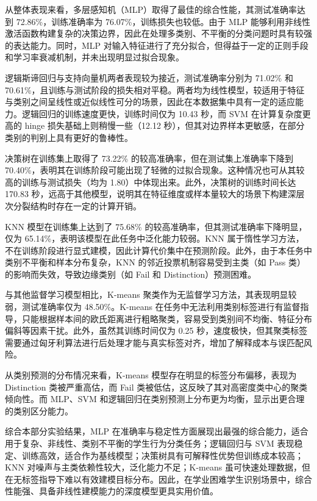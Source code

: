 \documentclass[a4paper, utf8]{ctexart}
\begin{document}
	从整体表现来看，多层感知机（MLP）取得了最佳的综合性能，其测试准确率达到 72.86\%，训练准确率为 76.07\%，训练损失也较低。由于 MLP 能够利用非线性激活函数构建复杂的决策边界，因此在处理多类别、不平衡的分类问题时具有较强的表达能力。同时，MLP 对输入特征进行了充分拟合，但得益于一定的正则手段和学习率衰减机制，并未出现明显过拟合现象。
	
	逻辑斯谛回归与支持向量机两者表现较为接近，测试准确率分别为 71.02\% 和 70.61\%，且训练与测试阶段的损失相对平稳。两者均为线性模型，较适用于特征与类别之间呈线性或近似线性可分的场景，因此在本数据集中具有一定的适应能力。逻辑回归的训练速度更快，训练时间仅为 10.43 秒，而 SVM 在计算复杂度更高的 hinge 损失基础上则稍慢一些（12.12 秒），但其对边界样本更敏感，在部分类别的判别上具有更好的鲁棒性。
	
	决策树在训练集上取得了 73.22\% 的较高准确率，但在测试集上准确率下降到 70.40\%，表明其在训练阶段可能出现了轻微的过拟合现象。这种情况也可从其较高的训练与测试损失（均为 1.80）中体现出来。此外，决策树的训练时间长达 170.83 秒，远高于其他模型，说明其在特征维度或样本量较大的场景下构建深层次分裂结构时存在一定的计算开销。
	
	KNN 模型在训练集上达到了 75.68\% 的较高准确率，但其测试准确率下降明显，仅为 65.14\%，表明该模型在此任务中泛化能力较弱。KNN 属于惰性学习方法，不在训练阶段进行显式建模，因此计算代价集中在预测阶段。此外，由于本任务中类别不平衡和样本分布复杂，KNN 的邻近投票机制容易受到主类（如 Pass 类）的影响而失效，导致边缘类别（如 Fail 和 Distinction）预测困难。
	
	与其他监督学习模型相比，K-means 聚类作为无监督学习方法，其表现明显较弱，测试准确率仅为 48.50\%。K-means 在任务中无法利用类别标签进行有监督指导，只能根据样本间的欧氏距离进行粗略聚类，容易受到类别间不均衡、特征分布偏斜等因素干扰。此外，虽然其训练时间仅为 0.25 秒，速度极快，但其聚类标签需要通过匈牙利算法进行后处理才能与真实标签对齐，增加了解释成本与误匹配风险。
	
	从类别预测的分布情况来看，K-means 模型存在明显的标签分布偏移，表现为 Distinction 类被严重高估，而 Fail 类被低估，这反映了其对高密度类中心的聚类倾向性。而 MLP、SVM 和逻辑回归在类别预测上分布更为均衡，显示出更合理的类别区分能力。
	
	综合本部分实验结果，MLP 在准确率与稳定性方面展现出最强的综合能力，适合用于复杂、非线性、类别不平衡的学生行为分类任务；逻辑回归与 SVM 表现稳定、训练高效，适合作为基线模型；决策树具有可解释性优势但训练成本较高；KNN 对噪声与主类依赖性较大，泛化能力不足；K-means 虽可快速处理数据，但在无标签指导下难以有效建模目标分布。因此，在学业困难学生识别场景中，综合性能强、具备非线性建模能力的深度模型更具实用价值。
	
\end{document}
